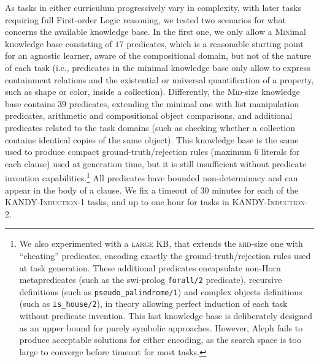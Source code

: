 %
As tasks in either curriculum progressively vary in complexity, with later tasks requiring full First-order Logic reasoning, we tested two scenarios for what concerns the available knowledge base. In the first one, we only allow a \textsc{\small Min}imal knowledge base consisting of $17$ predicates, which is a reasonable starting point for an agnostic learner, aware of the compositional domain, but not of the nature of each task (i.e., predicates in the minimal knowledge base only allow to express containment relations and the existential or universal quantification of a property, such as shape or color, inside a collection).
%
Differently, the \textsc{\small Mid}-size knowledge base contains $39$ predicates, extending the minimal one with list manipulation predicates, arithmetic and compositional object comparisons, and additional predicates related to the task domains (such as checking whether a collection contains identical copies of the same object). 
This knowledge base is the same used to produce compact ground-truth/rejection rules (maximum $6$ literals for each clause) used at generation time, but it is still insufficient without predicate invention capabilities.\footnote{We also experimented with a \textsc{\small large} KB, that extends the \textsc{\small mid}-size one with ``cheating'' predicates, encoding exactly the ground-truth/rejection rules used at task generation. These additional predicates encapsulate non-Horn metapredicates (such as the swi-prolog \texttt{forall/2} predicate), recursive definitions (such as \texttt{pseudo\_palindrome/1}) and complex objects definitions (such as \texttt{is\_house/2}), in theory allowing perfect induction of each task without predicate invention. This last knowledge base is deliberately designed as an upper bound for purely symbolic approaches. However, Aleph fails to produce acceptable solutions for either encoding, as the search space is too large to converge before timeout for most tasks.}
%
All predicates have bounded non-determinacy and can appear in the body of a clause.
%
%
We fix a timeout of 30 minutes for each of the \textsc{KANDY-Induction-1} tasks, and up to one hour for tasks in \textsc{KANDY-Induction-2}.

